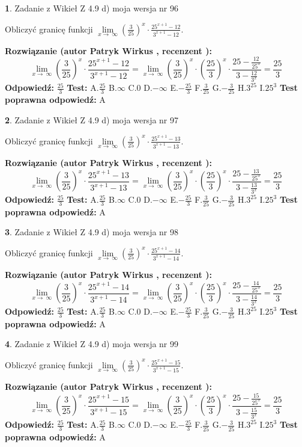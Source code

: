 \documentclass[12pt, a4paper]{article}
\theoremstyle{definition} %
\newtheorem{zad}{}
\newcommand{\zadStart}[1]{\begin{zad}#1\newline}
\newcommand{\zadStop}{\end{zad}}
\newcommand{\rozwStart}[2]{\noindent \textbf{Rozwiązanie (autor #1 , recenzent #2): }\newline}
\newcommand{\rozwStop}{\newline}
\newcommand{\odpStart}{\noindent \textbf{Odpowiedź:}\newline}
\newcommand{\odpStop}{\newline}
\newcommand{\testStart}{\noindent \textbf{Test:}\newline}
\newcommand{\testStop}{\newline}
\newcommand{\kluczStart}{\noindent \textbf{Test poprawna odpowiedź:}\newline}
\newcommand{\kluczStop}{\newline}
\begin{document}
\zadStart{Zadanie z Wikieł Z 4.9 d) moja wersja nr 96}


Obliczyć granicę funkcji  $\lim\limits_{x\to\ \infty}(\frac{3}{25})^{x}\cdot\frac{25^{x+1}-12}{3^{x+1}-12}$.
\zadStop
\rozwStart{Patryk Wirkus}{}
$$\lim\limits_{x\to\ \infty}(\frac{3}{25})^{x}\cdot\frac{25^{x+1}-12}{3^{x+1}-12}=\lim\limits_{x\to\ \infty}(\frac{3}{25})^{x}\cdot(\frac{25}{3})^{x} \cdot \frac{25-\frac{12}{25^{x}}}{3-\frac{12}{3^{x}}} = \frac{25}{3}$$
\rozwStop
\odpStart
$\frac{25}{3}$
\odpStop
\testStart
A.$\frac{25}{3}$ B.$\infty$ C.$0$ D.$-\infty$ E.$-\frac{25}{3}$
F.$\frac{3}{25}$ G.$-\frac{3}{25}$
H.$3^{25}$
I.$25^{3}$
\testStop
\kluczStart
A
\kluczStop



\zadStart{Zadanie z Wikieł Z 4.9 d) moja wersja nr 97}


Obliczyć granicę funkcji  $\lim\limits_{x\to\ \infty}(\frac{3}{25})^{x}\cdot\frac{25^{x+1}-13}{3^{x+1}-13}$.
\zadStop
\rozwStart{Patryk Wirkus}{}
$$\lim\limits_{x\to\ \infty}(\frac{3}{25})^{x}\cdot\frac{25^{x+1}-13}{3^{x+1}-13}=\lim\limits_{x\to\ \infty}(\frac{3}{25})^{x}\cdot(\frac{25}{3})^{x} \cdot \frac{25-\frac{13}{25^{x}}}{3-\frac{13}{3^{x}}} = \frac{25}{3}$$
\rozwStop
\odpStart
$\frac{25}{3}$
\odpStop
\testStart
A.$\frac{25}{3}$ B.$\infty$ C.$0$ D.$-\infty$ E.$-\frac{25}{3}$
F.$\frac{3}{25}$ G.$-\frac{3}{25}$
H.$3^{25}$
I.$25^{3}$
\testStop
\kluczStart
A
\kluczStop



\zadStart{Zadanie z Wikieł Z 4.9 d) moja wersja nr 98}


Obliczyć granicę funkcji  $\lim\limits_{x\to\ \infty}(\frac{3}{25})^{x}\cdot\frac{25^{x+1}-14}{3^{x+1}-14}$.
\zadStop
\rozwStart{Patryk Wirkus}{}
$$\lim\limits_{x\to\ \infty}(\frac{3}{25})^{x}\cdot\frac{25^{x+1}-14}{3^{x+1}-14}=\lim\limits_{x\to\ \infty}(\frac{3}{25})^{x}\cdot(\frac{25}{3})^{x} \cdot \frac{25-\frac{14}{25^{x}}}{3-\frac{14}{3^{x}}} = \frac{25}{3}$$
\rozwStop
\odpStart
$\frac{25}{3}$
\odpStop
\testStart
A.$\frac{25}{3}$ B.$\infty$ C.$0$ D.$-\infty$ E.$-\frac{25}{3}$
F.$\frac{3}{25}$ G.$-\frac{3}{25}$
H.$3^{25}$
I.$25^{3}$
\testStop
\kluczStart
A
\kluczStop



\zadStart{Zadanie z Wikieł Z 4.9 d) moja wersja nr 99}


Obliczyć granicę funkcji  $\lim\limits_{x\to\ \infty}(\frac{3}{25})^{x}\cdot\frac{25^{x+1}-15}{3^{x+1}-15}$.
\zadStop
\rozwStart{Patryk Wirkus}{}
$$\lim\limits_{x\to\ \infty}(\frac{3}{25})^{x}\cdot\frac{25^{x+1}-15}{3^{x+1}-15}=\lim\limits_{x\to\ \infty}(\frac{3}{25})^{x}\cdot(\frac{25}{3})^{x} \cdot \frac{25-\frac{15}{25^{x}}}{3-\frac{15}{3^{x}}} = \frac{25}{3}$$
\rozwStop
\odpStart
$\frac{25}{3}$
\odpStop
\testStart
A.$\frac{25}{3}$ B.$\infty$ C.$0$ D.$-\infty$ E.$-\frac{25}{3}$
F.$\frac{3}{25}$ G.$-\frac{3}{25}$
H.$3^{25}$
I.$25^{3}$
\testStop
\kluczStart
A
\kluczStop
\end{document}
